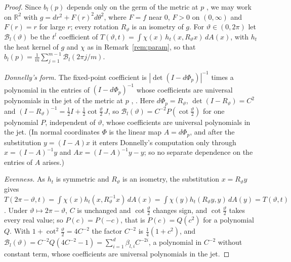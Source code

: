 \documentclass[pdflatex,sn-mathphys-num]{sn-jnl}
\theoremstyle{thmstyleone}%
\theoremstyle{thmstylethree}%
\newcommand{\R}{\mathbb{R}}
\begin{document}
\begin{proof}
Since $b_l(p)$ depends only on the germ of the metric at $p$ \cite[Thm~4.8]{dggw2008}, we may work on $\R^2$ with $g=dr^2+F(r)^2d\theta^2$, where $F=f$ near $0$, $F>0$ on $(0,\infty)$ and $F(r)=r$ for large $r$; every rotation $R_\vartheta$ is an isometry of $g$. For $\vartheta\in(0,2\pi)$ let $\mathcal B_l(\vartheta)$ be the $t^l$ coefficient of $T(\vartheta,t)=\int\chi(x)\,h_t(x,R_\vartheta x)\,dA(x)$, with $h_t$ the heat kernel of $g$ and $\chi$ as in Remark~\ref{rem:param}, so that $b_l(p)=\frac1m\sum_{j=1}^{m-1}\mathcal B_l(2\pi j/m)$.

\emph{Donnelly's form.} The fixed-point coefficient is $|\det(I-d\Phi_p)|^{-1}$ times a polynomial in the entries of $(I-d\Phi_p)^{-1}$ whose coefficients are universal polynomials in the jet of the metric at $p$ \cite{donnelly1976}, \cite[4.2]{dggw2008}. Here $d\Phi_p=R_\vartheta$, $\det(I-R_\vartheta)=C^2$ and $(I-R_\vartheta)^{-1}=\frac12I+\frac12\cot\frac\vartheta2\,J$, so $\mathcal B_l(\vartheta)=C^{-2}P(\cot\frac\vartheta2)$ for one polynomial $P$, independent of $\vartheta$, whose coefficients are universal polynomials in the jet. (In normal coordinates $\Phi$ is the linear map $A=d\Phi_p$, and after the substitution $y=(I-A)x$ it enters Donnelly's computation only through $x=(I-A)^{-1}y$ and $Ax=(I-A)^{-1}y-y$; so no separate dependence on the entries of $A$ arises.)

\emph{Evenness.} As $h_t$ is symmetric and $R_\vartheta$ is an isometry, the substitution $x=R_\vartheta y$ gives $T(2\pi-\vartheta,t)=\int\chi(x)h_t(x,R_\vartheta^{-1}x)\,dA(x)=\int\chi(y)h_t(R_\vartheta y,y)\,dA(y)=T(\vartheta,t)$. Under $\vartheta\mapsto2\pi-\vartheta$, $C$ is unchanged and $\cot\frac\vartheta2$ changes sign, and $\cot\frac\vartheta2$ takes every real value; so $P(c)=P(-c)$, that is $P(c)=Q(c^2)$ for a polynomial $Q$. With $1+\cot^2\frac\vartheta2=4C^{-2}$ the factor $C^{-2}$ is $\frac14(1+c^2)$, and $\mathcal B_l(\vartheta)=C^{-2}Q(4C^{-2}-1)=\sum_{i=1}^{d}\beta_{l,i}C^{-2i}$, a polynomial in $C^{-2}$ without constant term, whose coefficients are universal polynomials in the jet.


\end{proof}
\end{document}
